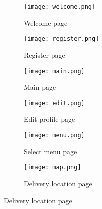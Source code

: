 \documentclass[12pt]{article}
\begin{document}
\begin{figure}[h!]
	\centering
	\begin{subfigure}[b]{0.3\linewidth}
		\texttt{[image: welcome.png]}
		\caption{Welcome page}
		\vspace{1cm}
		\hspace{2cm}
	\end{subfigure}
	\begin{subfigure}[b]{0.3\linewidth}
		\texttt{[image: register.png]}
		\caption{Register page}
		\vspace{1cm}
		\hspace{2cm}
	\end{subfigure}
	\begin{subfigure}[b]{0.3\linewidth}
		\texttt{[image: main.png]}
		\caption{Main page}
		\vspace{1cm}
		\hspace{2cm}
	\end{subfigure}

	\centering
	\begin{subfigure}[b]{0.3\linewidth}
		\texttt{[image: edit.png]}
		\caption{Edit profile page}
		\vspace{1cm}
		\hspace{2cm}
	\end{subfigure}
	\begin{subfigure}[b]{0.3\linewidth}
		\texttt{[image: menu.png]}
		\caption{Select menu page}
		\vspace{1cm}
		\hspace{2cm}
	\end{subfigure}
	\begin{subfigure}[b]{0.3\linewidth}
		\texttt{[image: map.png]}
		\caption{Delivery location page}
		\vspace{1cm}
		\hspace{2cm}
	\end{subfigure}
	
\end{figure}

\newpage
\end{document}
